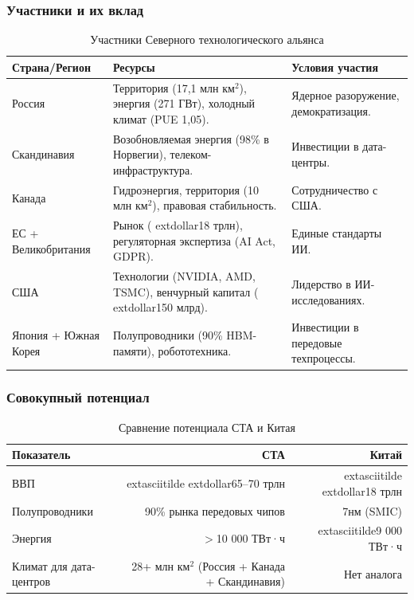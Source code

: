 \documentclass[11pt, a4paper]{article}
\begin{document}
\subsubsection*{Участники и их вклад}
\begin{table}[H]
\centering
\begin{tabular}{l l l}
\toprule
\textbf{Страна/Регион} & \textbf{Ресурсы} & \textbf{Условия участия} \\
\midrule
Россия & Территория (17,1 млн км$^2$), энергия (271 ГВт), холодный климат (PUE 1,05). & Ядерное разоружение, демократизация. \\
Скандинавия & Возобновляемая энергия (98\% в Норвегии), телеком-инфраструктура. & Инвестиции в дата-центры. \\
Канада & Гидроэнергия, территория (10 млн км$^2$), правовая стабильность. & Сотрудничество с США. \\
ЕС + Великобритания & Рынок (	extdollar18 трлн), регуляторная экспертиза (AI Act, GDPR). & Единые стандарты ИИ. \\
США & Технологии (NVIDIA, AMD, TSMC), венчурный капитал (	extdollar150 млрд). & Лидерство в ИИ-исследованиях. \\
Япония + Южная Корея & Полупроводники (90\% HBM-памяти), робототехника. & Инвестиции в передовые техпроцессы. \\
\bottomrule
\end{tabular}
\caption{Участники Северного технологического альянса}
\end{table}

\subsubsection*{Совокупный потенциал}
\begin{table}[H]
\centering
\begin{tabular}{l r r}
\toprule
\textbf{Показатель} & \textbf{СТА} & \textbf{Китай} \\
\midrule
ВВП & 	extasciitilde	extdollar65--70 трлн & 	extasciitilde	extdollar18 трлн \\
Полупроводники & 90\% рынка передовых чипов & 7нм (SMIC) \\
Энергия & $>$10 000 ТВт·ч & 	extasciitilde9 000 ТВт·ч \\
Климат для дата-центров & 28+ млн км$^2$ (Россия + Канада + Скандинавия) & Нет аналога \\
\bottomrule
\end{tabular}
\caption{Сравнение потенциала СТА и Китая}
\end{table}
\end{document}
